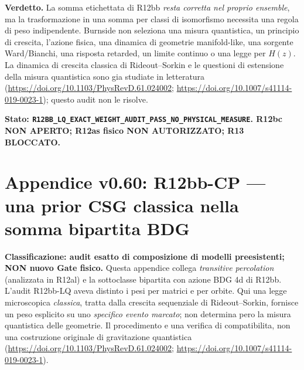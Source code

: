 \documentclass[11pt,a4paper]{article}
\begin{document}
\textbf{Verdetto.} La somma etichettata di R12bb \emph{resta corretta nel proprio ensemble}, ma la trasformazione in una somma per classi di isomorfismo necessita una regola di peso indipendente. Burnside non seleziona una misura quantistica, un principio di crescita, l'azione fisica, una dinamica di geometrie manifold-like, una sorgente Ward/Bianchi, una risposta retarded, un limite continuo o una legge per $H(z)$. La dinamica di crescita classica di Rideout--Sorkin e le questioni di estensione della misura quantistica sono gia studiate in letteratura (\url{https://doi.org/10.1103/PhysRevD.61.024002}; \url{https://doi.org/10.1007/s41114-019-0023-1}); questo audit non le risolve.

\textbf{Stato: \texttt{R12BB\_LQ\_EXACT\_WEIGHT\_AUDIT\_PASS\_NO\_PHYSICAL\_MEASURE}. R12bc NON APERTO; R12as fisico NON AUTORIZZATO; R13 BLOCCATO.}




\section*{Appendice v0.60: R12bb-CP --- una prior CSG classica nella somma bipartita BDG}
\label{sec:r12bbcp}
\textbf{Classificazione: audit esatto di composizione di modelli preesistenti; NON nuovo Gate fisico.}
Questa appendice collega \emph{transitive percolation} (analizzata in R12al) e la sottoclasse bipartita con azione BDG 4d di R12bb. L'audit R12bb-LQ aveva distinto i pesi per matrici e per orbite. Qui una legge microscopica \emph{classica}, tratta dalla crescita sequenziale di Rideout--Sorkin, fornisce un peso esplicito su uno \emph{specifico evento marcato}; non determina pero la misura quantistica delle geometrie. Il procedimento e una verifica di compatibilita, non una costruzione originale di gravitazione quantistica (\url{https://doi.org/10.1103/PhysRevD.61.024002}; \url{https://doi.org/10.1007/s41114-019-0023-1}).
\end{document}
